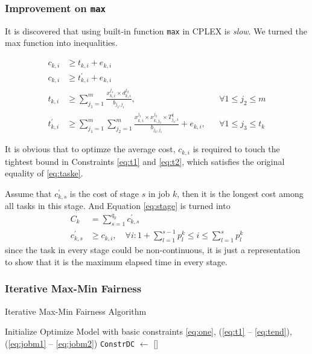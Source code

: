\begin{frame}[allowframebreaks]
\frametitle{Improvement on \texttt{max}}
It is discovered that using built-in function \texttt{max} in CPLEX is \emph{slow}. We turned the max function into inequalities. 

\begin{align}
    c_{k,i} &\geq t_{k,i} + e_{k,i} \label{eq:t1}\\
    c_{k,i} &\geq t_{k,i}^\prime + e_{k,i} \label{eq:t2}\\
    t_{k,i} &\geq \sum_{j_1=1}^m \frac{x_{k,i}^{j_1}\times d_{k,i}^{j_2}}{b_{j_2,j_1}},&& \forall 1\leq j_2\leq m\\
    t_{k,i}^\prime &\geq \sum_{j_1=1}^m\sum_{j_2=1}^m \frac{x_{k,i}^{j_1}\times x_{k,j_3}^{j_2}\times T_{j_3,i}^k}{b_{j_2,j_1}} + e_{k,i},&& \forall 1\leq j_3\leq t_k\label{eq:tend}
\end{align}

It is obvious that to optimze the average cost, $c_{k,i}$ is required to touch the tightest bound in Constraints \eqref{eq:t1} and \eqref{eq:t2}, which satisfies the original equality of \eqref{eq:taske}.

Assume that $c^\prime_{k,s}$ is the cost of stage $s$ in job $k$, then it is the longest cost among all tasks in this stage. And Equation \eqref{eq:stage} is turned into
\begin{align}
    C_k &= \sum_{s=1}^{q_k} c^{\prime}_{k,s} \label{eq:jobm1}\\
    c^\prime_{k,s} &\geq c_{k,i},\quad \forall i: 1+\sum_{l=1}^{s-1} p_{l}^k \leq i \leq \sum_{l=1}^{s} p_{l}^k \label{eq:jobm2}
\end{align}
since the task in every stage could be non-continuous, it is just a representation to show that it is the maximum elapsed time in every stage.
\end{frame}

\begin{frame}
\frametitle{Iterative Max-Min Fairness}

\begin{algorithm}[H]
    \caption{Iterative Max-Min Fairness Algorithm}
    Initialize Optimize Model with basic constraints \eqref{eq:one}, (\ref{eq:t1} -- \ref{eq:tend}), (\ref{eq:jobm1} -- \ref{eq:jobm2})\;
    \texttt{ConstrDC} $\leftarrow$ []\;
\end{algorithm}
\end{frame}

